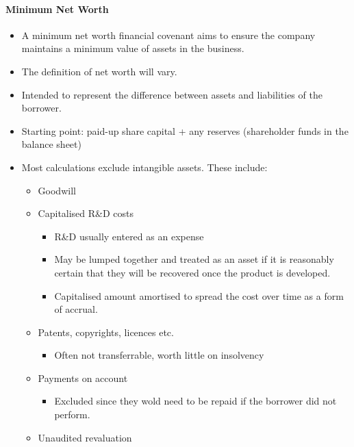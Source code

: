 \documentclass[
]{article}
\providecommand{\tightlist}{%
  \setlength{\itemsep}{0pt}\setlength{\parskip}{0pt}}
\begin{document}
\hypertarget{minimum-net-worth}{%
\paragraph{Minimum Net Worth}\label{minimum-net-worth}}

\begin{itemize}
\tightlist
\item
  A minimum net worth financial covenant aims to ensure the company
  maintains a minimum value of assets in the business.
\item
  The definition of net worth will vary.
\item
  Intended to represent the difference between assets and liabilities of
  the borrower.
\item
  Starting point: paid-up share capital + any reserves (shareholder
  funds in the balance sheet)
\item
  Most calculations exclude intangible assets. These include:

  \begin{itemize}
  \tightlist
  \item
    Goodwill
  \item
    Capitalised R\&D costs

    \begin{itemize}
    \tightlist
    \item
      R\&D usually entered as an expense
    \item
      May be lumped together and treated as an asset if it is reasonably
      certain that they will be recovered once the product is developed.
    \item
      Capitalised amount amortised to spread the cost over time as a
      form of accrual.
    \end{itemize}
  \item
    Patents, copyrights, licences etc.

    \begin{itemize}
    \tightlist
    \item
      Often not transferrable, worth little on insolvency
    \end{itemize}
  \item
    Payments on account

    \begin{itemize}
    \tightlist
    \item
      Excluded since they wold need to be repaid if the borrower did not
      perform.
    \end{itemize}
  \item
    Unaudited revaluation


\end{itemize}
\end{itemize}
\end{document}

